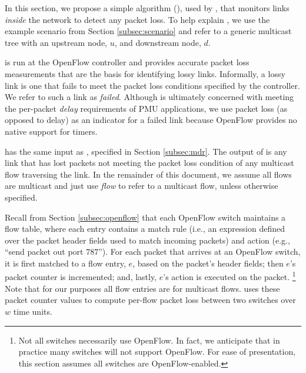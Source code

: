 
In this section, we propose a simple algorithm (\fls), used by \mdrs, that monitors links \emph{inside} the network to detect any packet loss.  To help explain \fls,
we use the example scenario from Section \ref{subsec:scenario} and refer to a generic multicast tree with an upstream node, $u$, and downstream node, $d$.

\fl is run at the OpenFlow controller and provides accurate packet loss measurements that are the basis for identifying lossy links.
Informally, a lossy link is one that fails to meet the packet loss conditions specified by the controller.  We refer to such a link as \emph{failed}.
Although \mdr is ultimately concerned with meeting the per-packet \emph{delay} requirements of PMU applications, 
we use  packet loss (as opposed to delay) as an indicator for a failed link because OpenFlow provides no native support for timers.

\fl has the same input as \mdrs, specified in Section \ref{subsec:mdr}.
The output of \fl is any link that has lost packets not meeting the packet loss condition of any multicast flow traversing the link. 
In the remainder of this document, we assume all flows are multicast and just use \emph{flow} to refer to a multicast flow, unless otherwise specified.

Recall from Section \ref{subsec:openflow} that each OpenFlow switch maintains a flow table, where each entry contains a match rule 
(i.e., an expression defined over the packet header fields used to match incoming packets) and action 
(e.g., ``send packet out port $787$''). For each packet that arrives at an OpenFlow switch, it is first matched to a flow entry, $e$, based on the packet's header fields; 
then $e$'s packet counter is incremented; and, lastly, $e$'s action is executed on the packet. 
\footnote{Not all switches necessarily use OpenFlow. In fact, we anticipate that in practice many switches will not support OpenFlow. For ease of presentation, this section assumes all switches are OpenFlow-enabled. }
Note that for our purposes all flow entries are for multicast flows. 
\fl uses these packet counter values to compute per-flow packet loss between two switches over $w$ time units. 


